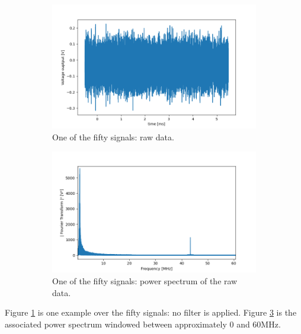 \documentclass[10pt]{report}
\begin{document}
\begin{figure}[h!]
\centering
\begin{subfigure}{.48\textwidth}
  \centering
  \includegraphics[width=1.1\linewidth]{sp-f-rough}
  \caption{One of the fifty signals: raw data.}
  \label{fig:sp-f-rough}
\end{subfigure}%
\hspace{1em}%
\begin{subfigure}{.48\textwidth}
  \centering
  \includegraphics[width=1.1\linewidth]{sp-fft-rough}
  \caption{One of the fifty signals: power spectrum of the raw data.}
  \label{fig:sp-fft-rough}
\end{subfigure}
\caption{}
\end{figure}

Figure \ref{fig:sp-f-rough} is one example over the fifty signals: no filter is applied. Figure \ref{fig:sp-fft-rough} is the associated power spectrum windowed between approximately 0 and 60MHz.
\end{document}

